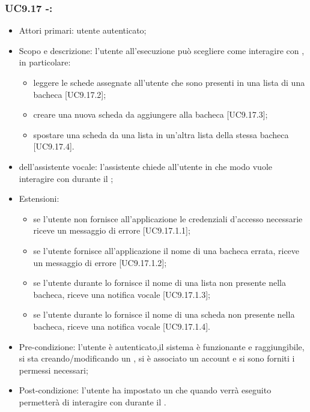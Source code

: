 \subsubsection{UC9.17 -: }
\begin{itemize}
	\item  Attori primari: utente autenticato;
	\item  Scopo e descrizione: l'utente all'esecuzione può scegliere come interagire con , in particolare:
		   \begin{itemize}
				\item leggere le schede assegnate all'utente che sono presenti in una lista di una bacheca [UC9.17.2];
				\item creare una nuova scheda da aggiungere alla bacheca [UC9.17.3];
				\item spostare una scheda da una lista in un'altra lista della stessa bacheca [UC9.17.4].
		   \end{itemize}
	\item  {} dell'assistente vocale: l'assistente chiede all'utente in che modo vuole interagire con  durante il ;
	\item  Estensioni: 
		   \begin{itemize}
				\item se l'utente non fornisce all'applicazione le credenziali d'accesso necessarie riceve un messaggio di errore [UC9.17.1.1];
				\item se l'utente fornisce all'applicazione il nome di una bacheca errata, riceve un messaggio di errore [UC9.17.1.2];
				\item se l'utente durante lo  fornisce il nome di una lista non presente nella bacheca, riceve una notifica vocale [UC9.17.1.3];
				\item se l'utente durante lo  fornisce il nome di una scheda non presente nella bacheca, riceve una notifica vocale [UC9.17.1.4].
		   \end{itemize}
	\item  Pre-condizione: l'utente è autenticato,il sistema è funzionante e raggiungibile, si sta creando/modificando un , si è associato un account  e si sono forniti i permessi necessari;
	\item  Post-condizione: l'utente ha impostato un  che quando verrà eseguito permetterà di interagire con  durante il .
\end{itemize}


